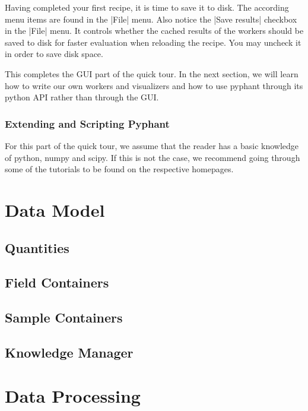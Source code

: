 \documentclass[a4paper]{article}
\begin{document}
Having completed your first recipe, it is time to save it to
disk. The according menu items are found in the |File| menu. Also
notice the |Save results| checkbox in the |File| menu. It controls
whether the cached results of the workers should be saved to disk for
faster evaluation when reloading the recipe. You may uncheck it in
order to save disk space.

This completes the GUI part of the quick tour. In the next section, we
will learn how to write our own workers and visualizers and how to use
pyphant through its python API rather than through the GUI.

\FloatBarrier
\subsubsection{Extending and Scripting Pyphant}
\label{sec:introduction_extending_and_scripting}

For this part of the quick tour, we assume that the reader has a basic
knowledge of python\cite{python}, numpy\cite{numpy} and
scipy\cite{scipy}. If this is not the case, we recommend going through
some of the tutorials to be found on the respective homepages.


\section{Data Model}
\label{sec:data_model}

\subsection{Quantities}
\label{sec:data_model_quantities}

\subsection{Field Containers}
\label{sec:data_model_fcs}

\subsection{Sample Containers}
\label{sec:data_model_scs}

\subsection{Knowledge Manager}
\label{sec:data_model_knowledge_manager}

\section{Data Processing}
\label{sec:data_processing}
\end{document}
